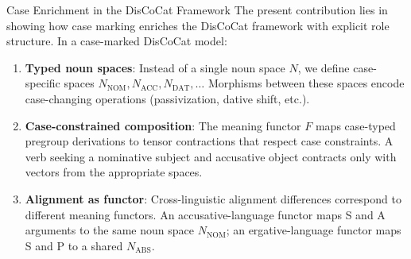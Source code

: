 \documentclass[
  ignorenonframetext,
]{beamer}
\begin{document}
\begin{frame}{Case Enrichment in the DisCoCat Framework}
\protect{}\label{case-enrichment-in-the-discocat-framework}
The present contribution lies in showing how case marking enriches the
DisCoCat framework with explicit role structure. In a case-marked
DisCoCat model:

\begin{enumerate}
\item
  \textbf{Typed noun spaces}: Instead of a single noun space \(N\), we
  define case-specific spaces
  \(N_{\text{NOM}}, N_{\text{ACC}}, N_{\text{DAT}}, \ldots\) Morphisms
  between these spaces encode case-changing operations (passivization,
  dative shift, etc.).
\item
  \textbf{Case-constrained composition}: The meaning functor \(F\) maps
  case-typed pregroup derivations to tensor contractions that respect
  case constraints. A verb seeking a nominative subject and accusative
  object contracts only with vectors from the appropriate spaces.
\item
  \textbf{Alignment as functor}: Cross-linguistic alignment differences
  correspond to different meaning functors. An accusative-language
  functor maps S and A arguments to the same noun space
  \(N_{\text{NOM}}\); an ergative-language functor maps S and P to a
  shared \(N_{\text{ABS}}\).
\end{enumerate}


\end{frame}
\end{document}
